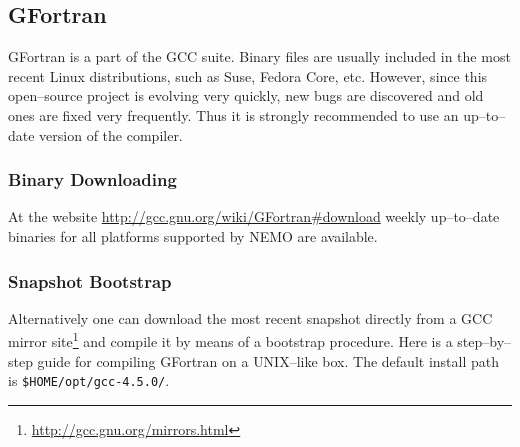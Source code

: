 \documentclass[a4paper,12pt]{article}%
\begin{document}
\subsection{GFortran}

GFortran is a part of the GCC suite. Binary files are usually
included in the most recent Linux distributions, such as Suse, Fedora
Core, etc. However, since this open--source project is evolving very
quickly, new bugs are discovered and old ones are fixed very
frequently. Thus it is strongly recommended to use an up--to--date
version of the compiler.

\subsubsection{Binary Downloading}

At the website \url{http://gcc.gnu.org/wiki/GFortran#download} weekly
up--to--date binaries for all platforms supported by NEMO are
available.

\subsubsection{Snapshot Bootstrap}

Alternatively one can download the most recent snapshot directly from
a GCC mirror site\footnote{\url{http://gcc.gnu.org/mirrors.html}} and
compile it by means of a bootstrap procedure. Here is a step--by--step
guide for compiling GFortran on a UNIX--like box. The default install
path is \verb+$HOME/opt/gcc-4.5.0/+.
\end{document}
